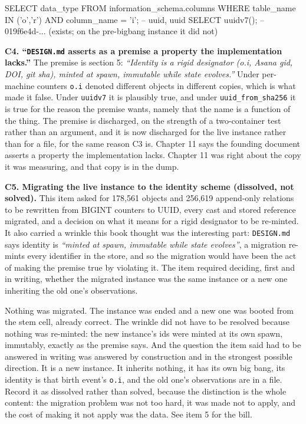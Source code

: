 \begin{Check}
SELECT data_type FROM information_schema.columns
  WHERE table_name IN ('o','r') AND column_name = 'i';   -- uuid, uuid
SELECT uuidv7();  -- 019f6e4d-...  (exists; on the pre-bigbang instance it did not)
\end{Check}

\textbf{C4. ``\texttt{DESIGN.md} asserts as a premise a property the implementation lacks.''} The premise is section 5: \textit{``Identity is a rigid designator (o.i, Asana gid, DOI, git sha), minted at spawn, immutable while state evolves.''} Under per-machine counters \texttt{o.i} denoted different objects in different copies, which is what made it false. Under \texttt{uuidv7} it is plausibly true, and under \texttt{uuid\_from\_sha256} it is true for the reason the premise wants, namely that the name is a function of the thing. The premise is discharged, on the strength of a two-container test rather than an argument, and it is now discharged for the live instance rather than for a file, for the same reason C3 is. Chapter 11 says the founding document asserts a property the implementation lacks. Chapter 11 was right about the copy it was measuring, and that copy is in the dump.

\textbf{C5. Migrating the live instance to the identity scheme (dissolved, not solved).} This item asked for 178,561 objects and 256,619 append-only relations to be rewritten from BIGINT counters to UUID, every cast and stored reference migrated, and a decision on what it means for a rigid designator to be re-minted. It also carried a wrinkle this book thought was the interesting part: \texttt{DESIGN.md} says identity is \textit{``minted at spawn, immutable while state evolves''}, a migration re-mints every identifier in the store, and so the migration would have been the act of making the premise true by violating it. The item required deciding, first and in writing, whether the migrated instance was the same instance or a new one inheriting the old one's observations.

Nothing was migrated. The instance was ended and a new one was booted from the stem cell, already correct. The wrinkle did not have to be resolved because nothing was re-minted: the new instance's ids were minted at its own spawn, immutably, exactly as the premise says. And the question the item said had to be answered in writing was answered by construction and in the strongest possible direction. It is a new instance. It inherits nothing, it has its own big bang, its identity is that birth event's \texttt{o.i}, and the old one's observations are in a file. Record it as dissolved rather than solved, because the distinction is the whole content: the migration problem was not too hard, it was made not to apply, and the cost of making it not apply was the data. See item 5 for the bill.


